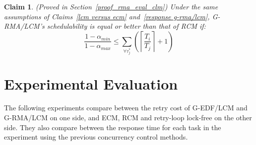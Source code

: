 \documentclass[conference]{sig-alternate}
\newtheorem{clm}{Claim}
\begin{document}
\begin{clm}\label{rma_eval_clm}
(Proved in Section~\ref{proof_rma_eval_clm}) Under the same assumptions of Claims~\ref{lcm versus ecm} and~\ref{response g-rma/lcm}, G-RMA/LCM's schedulability is equal or better than that of RCM if:
\begin{equation}
\frac{1-\alpha_{min}}{1-\alpha_{max}}\le \sum_{\forall \tau_j^*}\left( \left\lceil\frac{T_i}{T_j}\right\rceil +1 \right)
\label{eq70}\end{equation}
\end{clm}
%

\section{Experimental Evaluation}\label{exp_eval}
The following experiments compare between the retry cost of G-EDF/LCM and G-RMA/LCM on one side, and ECM, RCM and retry-loop lock-free on the other side. They also compare between the response time for each task in the experiment using the previous concurrency control methods.
\end{document}
